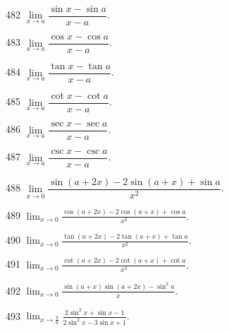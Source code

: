 
\begin{prob}[S]{482}
$\lim\limits_{x \to a} \dfrac{\sin x - \sin a}{x - a}$.
\end{prob}

\begin{prob}[S]{483}
$\lim\limits_{x \to a} \dfrac{\cos x - \cos a}{x - a}$.
\end{prob}

\begin{prob}[S]{484}
$\lim\limits_{x \to a} \dfrac{\tan x - \tan a}{x - a}$.
\end{prob}

\begin{prob}[S]{485}
$\lim\limits_{x \to a} \dfrac{\cot x - \cot a}{x - a}$.
\end{prob}

\begin{prob}[S]{486}
$\lim\limits_{x \to a} \dfrac{\sec x - \sec a}{x - a}$.
\end{prob}

\begin{prob}[S]{487}
$\lim\limits_{x \to a} \dfrac{\csc x - \csc a}{x - a}$.
\end{prob}

\begin{prob}[S]{488}
$\lim\limits_{x \to 0} \dfrac{\sin(a + 2x) - 2\sin(a + x) + \sin a}{x^2}$.
\end{prob}

\begin{prob}[S]{489}
$\displaystyle \lim_{x\to 0} \frac{\cos(a+2x) - 2\cos(a+x) + \cos a}{x^2}.$
\end{prob}

\begin{prob}[S]{490}
$\displaystyle \lim_{x\to 0} \frac{\tan(a+2x) - 2\tan(a+x) + \tan a}{x^2}.$
\end{prob}

\begin{prob}[S]{491}
$\displaystyle \lim_{x\to 0} \frac{\cot(a+2x) - 2\cot(a+x) + \cot a}{x^2}.$
\end{prob}

\begin{prob}[S]{492}
$\displaystyle \lim_{x\to 0} \frac{\sin(a+x)\sin(a+2x) - \sin^2 a}{x}.$
\end{prob}

\begin{prob}[S]{493}
$\displaystyle \lim_{x\to \frac{\pi}{6}} \frac{2\sin^2 x + \sin x - 1}{2\sin^2 x - 3\sin x + 1}.$
\end{prob}

